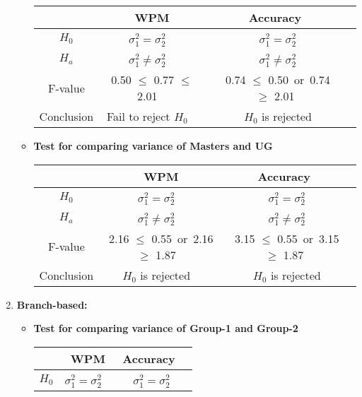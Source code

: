 \documentclass[12pt,a4paper]{report}
\begin{document}
\begin{enumerate}
\begin{itemize}
\begin{center}
        \begin{tabular}{ |c|c|c|c|}
          \hline
           & WPM & Accuracy \\
          \hline
          $H_0$ & $\sigma_1^2  = \sigma_2^2$ \ & \ $\sigma_1^2  = \sigma_2^2$ \\ 
          \hline
          $H_a$ & $\sigma_1^2  \neq \sigma_2^2$ \ & \ $\sigma_1^2  \neq \sigma_2^2$ \\
          \hline
          F-value &  0.50 $\leq$ 0.77 $\leq$ 2.01   \ & \ 0.74 $\leq$ 0.50\ or\  0.74 $\geq$ 2.01 \\
          \hline
          Conclusion & Fail to reject $H_0$ \ & \ $H_0$ is rejected\\
          \hline
        \end{tabular}
        \end{center}
        \item \textbf{Test for comparing variance of Masters and UG}
        \begin{center}
        \begin{tabular}{ |c|c|c|c|}
          \hline
           & WPM & Accuracy \\
          \hline
          $H_0$ & $\sigma_1^2  = \sigma_2^2$ \ & \ $\sigma_1^2  = \sigma_2^2$ \\ 
          \hline
          $H_a$ & $\sigma_1^2  \neq \sigma_2^2$ \ & \ $\sigma_1^2  \neq \sigma_2^2$ \\
          \hline
          F-value &  2.16 $\leq$ 0.55\ or\  2.16 $\geq$ 1.87   \ & \ 3.15 $\leq$ 0.55\ or\  3.15 $\geq$ 1.87 \\
          \hline
          Conclusion & $H_0$ is rejected \ & \ $H_0$ is rejected\\
          \hline
        \end{tabular}
        \end{center}
    \end{itemize}
        \item \textbf{Branch-based:}
    \begin{itemize}
        \item \textbf{Test for comparing variance of Group-1 and Group-2}
        \begin{center}
        \begin{tabular}{ |c|c|c|c|}
          \hline
           & WPM & Accuracy \\
          \hline
          $H_0$ & $\sigma_1^2  = \sigma_2^2$ \ & \ $\sigma_1^2  = \sigma_2^2$ \\ 
          \hline

\end{tabular}
\end{center}
\end{itemize}
\end{enumerate}
\end{document}
